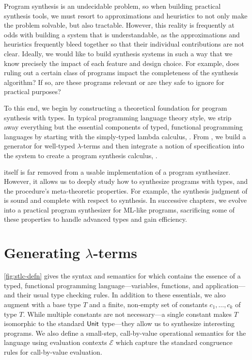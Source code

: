 Program synthesis is an undecidable problem, so when building practical synthesis tools, we must resort to approximations and heuristics to not only make the problem solvable, but also tractable.
However, this reality is frequently at odds with building a system that is understandable, as the approximations and heuristics frequently bleed together so that their individual contributions are not clear.
Ideally, we would like to build synthesis systems in such a way that we know precisely the impact of each feature and design choice.
For example, does ruling out a certain class of programs impact the completeness of the synthesis algorithm?
If so, are these programs relevant or are they safe to ignore for practical purposes?

To this end, we begin by constructing a theoretical foundation for program synthesis with types.
In typical programming language theory style, we strip away everything but the essential components of typed, functional programming languages by starting with the simply-typed lambda calculus, \stlc{}.
From \stlc{}, we build a generator for well-typed $λ$-terms and then integrate a notion of specification into the system to create a program synthesis calculus, \lsyn{}.

\lsyn{} itself is far removed from a usable implementation of a program synthesizer.
However, it allows us to deeply study how to synthesize programs with types, and the procedure's meta-theoretic properties.
For example, the synthesis judgment of \lsyn{} is sound and complete with respect to synthesis.
In successive chapters, we evolve \lsyn{} into a practical program synthesizer for ML-like programs, sacrificing some of these properties to handle advanced types and gain efficiency.

\section{Generating \texorpdfstring{$λ$}{λ}-terms}
\label{sec:generating-lambda-terms}



\autoref{fig:stlc-defn} gives the syntax and semantics for \stlc{} which contains the essence of a typed, functional programming language---variables, functions, and application---and their usual type checking rules.
In addition to these essentials, we also augment \stlc{} with a base type $T$ and a finite, non-empty set of constants $c_1, …, c_k$ of type $T$.
While multiple constants are not necessary---a single constant makes $T$ isomorphic to the standard $\mathsf{Unit}$ type---they allow us to synthesize interesting programs.
We also define a small-step, call-by-value operational semantics for the language using evaluation contexts $ℰ$ which capture the standard congruence rules for call-by-value evaluation.

